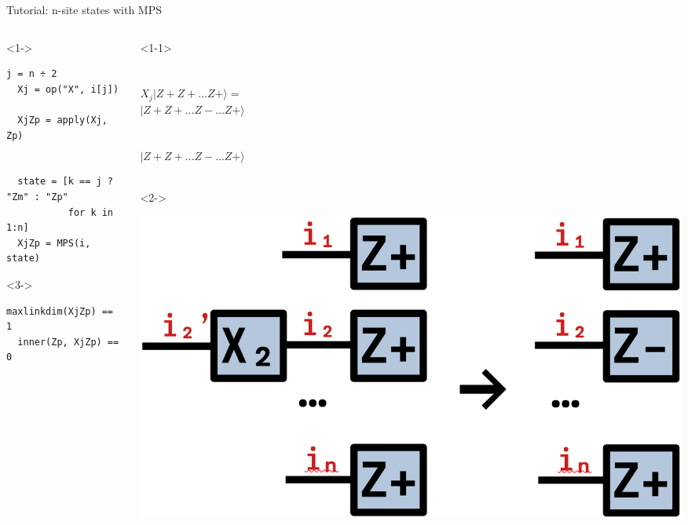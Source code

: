 \begin{frame}[fragile]{Tutorial: n-site states with MPS}

\begin{columns}

\begin{column}{6cm}

\begin{onlyenv}<1->
\begin{lstlisting}[language=JuliaLocal, style=julia, mathescape, basicstyle=\scriptsize\ttfamily]
  j = n ÷ 2
  Xj = op("X", i[j])

  XjZp = apply(Xj, Zp)


  state = [k == j ? "Zm" : "Zp"
           for k in 1:n]
  XjZp = MPS(i, state)
\end{lstlisting}
\end{onlyenv}

\begin{onlyenv}<3->
\begin{lstlisting}[language=JuliaLocal, style=julia, mathescape, basicstyle=\scriptsize\ttfamily]
  maxlinkdim(XjZp) == 1
  inner(Zp, XjZp) == 0
\end{lstlisting}
\end{onlyenv}

\end{column}

\begin{column}{4.5cm}

\begin{onlyenv}<1-1>
~\\
~\\
~\\
$X_j|Z+Z+\dots Z+\rangle =$ \\
$|Z+Z+\dots Z-\dots Z+\rangle$ \\
~\\
~\\
$|Z+Z+\dots Z-\dots Z+\rangle$ \\
~\\
\end{onlyenv}

\begin{onlyenv}<2->
\vspace*{0.0cm}
\begin{center}
\includegraphics[width=1.0\textwidth]{
  slides/assets/XjZpn.png
}
\end{center}
\vspace*{0.0cm}
\end{onlyenv}


\end{column}
\end{columns}
\end{frame}
